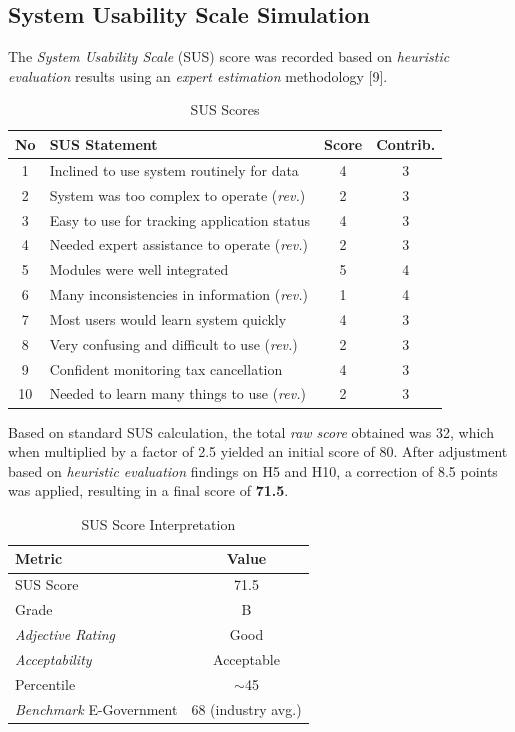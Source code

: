 \documentclass[conference,a4paper]{IEEEtran}
\begin{document}
\subsection{System Usability Scale Simulation}
\label{subsec:sus-simulation}

The \emph{System Usability Scale} (SUS) score was recorded based on \emph{heuristic evaluation} results using an \emph{expert estimation} methodology [9].

\begin{table}[!t]
\centering
\caption{SUS Scores}
\label{tab:sus-scores}
\renewcommand{\arraystretch}{1.0}
\footnotesize
\setlength{\tabcolsep}{2pt}
\begin{tabular}{c|l|c|c}
\hline
\textbf{No} & \textbf{SUS Statement} & \textbf{Score} & \textbf{Contrib.} \\
\hline
1 & Inclined to use system routinely for data & 4 & 3 \\
2 & System was too complex to operate (\emph{rev.}) & 2 & 3 \\
3 & Easy to use for tracking application status & 4 & 3 \\
4 & Needed expert assistance to operate (\emph{rev.}) & 2 & 3 \\
5 & Modules were well integrated & 5 & 4 \\
6 & Many inconsistencies in information (\emph{rev.}) & 1 & 4 \\
7 & Most users would learn system quickly & 4 & 3 \\
8 & Very confusing and difficult to use (\emph{rev.}) & 2 & 3 \\
9 & Confident monitoring tax cancellation & 4 & 3 \\
10 & Needed to learn many things to use (\emph{rev.}) & 2 & 3 \\
\hline
\end{tabular}
\end{table}

Based on standard SUS calculation, the total \emph{raw score} obtained was 32, which when multiplied by a factor of 2.5 yielded an initial score of 80. After adjustment based on \emph{heuristic evaluation} findings on H5 and H10, a correction of 8.5 points was applied, resulting in a final score of \textbf{71.5}.

\begin{table}[!t]
\centering
\caption{SUS Score Interpretation}
\label{tab:sus-interpretation}
\renewcommand{\arraystretch}{1.0}
\footnotesize
\setlength{\tabcolsep}{2pt}
\begin{tabular}{l|c}
\hline
\textbf{Metric} & \textbf{Value} \\
\hline
SUS Score & 71.5 \\
Grade & B \\
\emph{Adjective Rating} & Good \\
\emph{Acceptability} & Acceptable \\
Percentile & $\sim$45 \\
\emph{Benchmark} E-Government & 68 (industry avg.) \\
\hline
\end{tabular}
\end{table}
\end{document}
